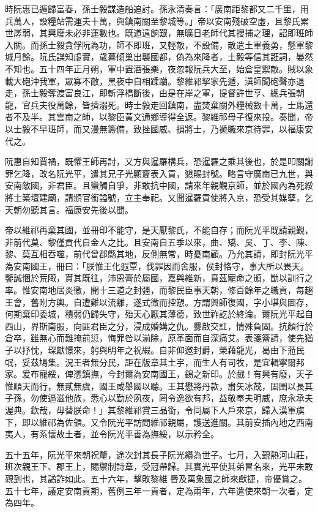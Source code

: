 \begin{pinyinscope}
時阮惠已遁歸富春，孫士毅謀造船追討。孫永清奏言：「廣南距黎都又二千里，用兵萬人，設糧站需運夫十萬，與鎮南關至黎城等。」帝以安南殘破空虛，且黎氏累世孱弱，其興廢未必非運數也。既道遠餉艱，無曠日老師代其搜捕之理，詔即班師入關。而孫士毅貪俘阮為功，師不即班，又輕敵，不設備，散遣土軍義勇，懸軍黎城月餘。阮氏諜知虛實，歲暮傾巢出襲國都，偽為來降者，士毅等信其誑詞，晏然不知也。五十四年正月朔，軍中置酒張樂，夜忽報阮兵大至，始倉皇禦敵。賊以象載大砲沖我軍，眾寡不敵，黑夜中自相蹂躪。黎維祁挈家先遁，滇師聞砲聲亦退走，孫士毅奪渡富良江，即斬浮橋斷後，由是在岸之軍，提督許世亨、總兵張朝龍，官兵夫役萬餘，皆擠溺死。時士毅走回鎮南，盡焚棄關外糧械數十萬，士馬還者不及半。其雲南之師，以黎臣黃文通鄉導得全返。黎維祁母子復來投。奏聞，帝以士毅不早班師，而又漫無籌備，致挫國威、損將士，乃褫職來京待罪，以福康安代之。

阮惠自知賈禍，既懼王師再討，又方與暹羅構兵，恐暹羅之乘其後也，於是叩關謝罪乞降，改名阮光平，遣其兄子光顯齎表入貢，懇賜封號。略言守廣南已九世，與安南敵國，非君臣。且蠻觸自爭，非敢抗中國，請來年親覲京師，並於國內為死綏將士築壇建廟，請頒官銜謚號，立主奉祀。又聞暹羅貢使將入京，恐受其媒孽，乞天朝勿聽其言。福康安先後以聞。

帝以維祁再棄其國，並冊印不能守，是天厭黎氏，不能自存；而阮光平既請親覲，非前代莫、黎僅貢代自金人之比。且安南自五季以來，曲、矯、吳、丁、李、陳、黎、莫互相吞噬，前代曾郡縣其地，反側無常，時憂南顧。乃允其請，即封阮光平為安南國王，冊曰：「朕惟王化遐覃，伐罪因而舍服，侯封恪守，事大所以畏天。鑒誠悃於荒陬，貰其既往，沛恩膏於屬國，嘉與維新，賁茲寵命之頒，勖以訓行之率。惟安南地居炎徼，開十三道之封疆，而黎民臣事天朝，修百餘年之職貢，每趨王會，舊附方輿。自遭難以流離，遂式微而控愬。方謂興師復國，字小堪與圖存，何期棄印委城，積弱仍歸失守，殆天心厭其薄德，致世祚訖於終淪。爾阮光平起自西山，界斯南服，向匪君臣之分，浸成婚媾之仇。釁啟交訌，情殊負固。抗顏行於倉卒，雖無心而難掩前愆，悔罪咎以湔除，原革面而自深痛艾。表箋籥請，使先猶子以抒忱，琛獻憬來，躬與明年之祝嘏。自非仰邀封爵，榮藉龍光，曷由下蒞民氓，妥茲鳩集。況王者無分民，詎在版章其土宇，而生人有司牧，是宜輯寧爾邦家。爰布寵綏，俾憑鎮撫，今封爾為安南國王，錫之新印。於戲！有興有廢，天子惟順天而行，無貳無虞，國王咸舉國以聽。王其懋將丹款，肅矢冰兢，固圉以長其子孫，勿使逼滋他族，悉心以勤於夙夜，罔令逸欲有邦，益敬奉夫明威，庶永承夫渥典。欽哉，毋替朕命！」其黎維祁賞三品銜，令同屬下人戶來京，歸入漢軍旗下，即以維祁為佐領。又令阮光平訪問維祁親屬，護送進關。其前安插內地之西南夷人，有系懷故土者，並令阮光平善為撫綏，以示矜全。

五十五年，阮光平來朝祝釐，途次封其長子阮光纘為世子。七月，入覲熱河山莊，班次親王下、郡王上，賜禦制詩章，受冠帶歸。其實光平使其弟冒名來，光平未敢親到也，其譎詐如此。五十六年，擊敗黎維昬及萬象國之師來獻捷，帝優賞之。五十七年，議定安南貢期，舊例三年一貢者，定為兩年，六年遣使來朝一次者，定為四年。


\end{pinyinscope}
